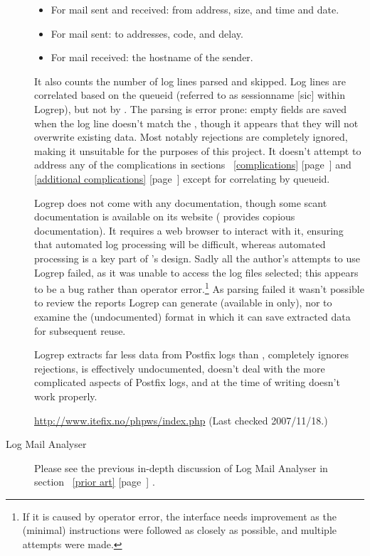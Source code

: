 \documentclass[a4paper,12pt,draft]{article}
\newcommand{\parsername}{\PLP{}}
\newcommand{\parsernames}{\PLP{}'s}
\newcommand{\refwithpage}[1]{%
    \empty{}\ref{#1} [page~\pageref{#1}]%
}
\begin{document}
\begin{description}
\begin{itemize}
            \item For mail sent and received: from address, size, and time
                and date.

            \item For mail sent: to addresses, \SMTP{} code, and delay.

            \item For mail received: the hostname of the sender.

        \end{itemize}

        It also counts the number of log lines parsed and skipped.  Log
        lines are correlated based on the queueid (referred to as
        sessionname [sic] within Logrep), but not by \pid{}.  The parsing
        is error prone: empty fields are saved when the log line doesn't
        match the \regex{}, though it appears that they will not overwrite
        existing data.  Most notably rejections are completely ignored,
        making it unsuitable for the purposes of this project.  It doesn't
        attempt to address any of the complications in
        sections~\refwithpage{complications} and~\refwithpage{additional
        complications} except for correlating by queueid.

        Logrep does not come with any documentation, though some scant
        documentation is available on its website (\parsername{} provides
        copious documentation).  It requires a web browser to interact with
        it, ensuring that automated log processing will be difficult,
        whereas automated processing is a key part of \parsernames{}
        design.  Sadly all the author's attempts to use Logrep failed, as
        it was unable to access the log files selected; this appears to be
        a bug rather than operator error.\footnote{If it is caused by
        operator error, the interface needs improvement as the (minimal)
        instructions were followed as closely as possible, and multiple
        attempts were made.}  As parsing failed it wasn't possible to
        review the reports Logrep can generate (available in \HTML{} only),
        nor to examine the (undocumented) format in which it can save
        extracted data for subsequent reuse.

        Logrep extracts far less data from Postfix logs than \parsername{},
        completely ignores rejections, is effectively undocumented, doesn't
        deal with the more complicated aspects of Postfix logs, and at the
        time of writing doesn't work properly.

        \url{http://www.itefix.no/phpws/index.php} \newline (Last checked
        2007/11/18.)

    \item [Log Mail Analyser] Please see the previous in-depth discussion
        of Log Mail Analyser in section~\refwithpage{prior art}.

\end{description}
\end{document}
